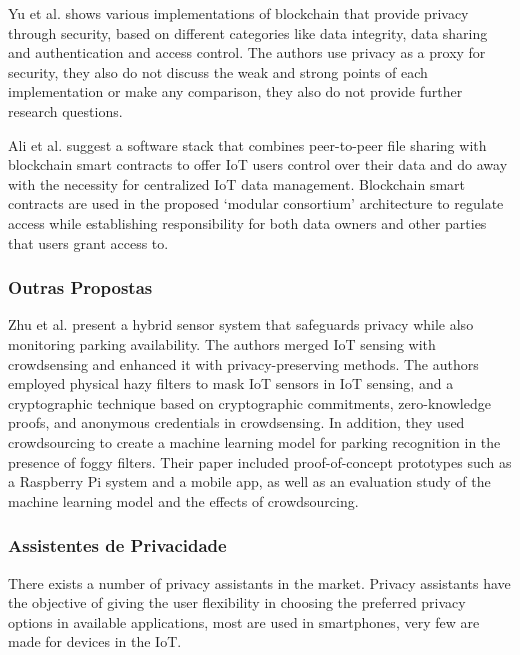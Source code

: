 \documentclass[conference]{IEEEtran}
\begin{document}
Yu et al. \cite{yu2018blockchain} shows various implementations of blockchain
that provide privacy through security, based on different categories like
data integrity, data sharing and authentication and access control. The
authors use privacy as a proxy for security, they also do not discuss the
weak and strong points of each implementation or make any comparison, they
also do not provide further research questions.

Ali et al. \cite{AliIoT} suggest a software stack that combines peer-to-peer
file sharing with blockchain smart contracts to offer IoT users control
over their data and do away with the necessity for centralized IoT data
management. Blockchain smart contracts are used in the proposed `modular
consortium' architecture to regulate access while establishing responsibility
for both data owners and other parties that users grant access to.

\subsubsection{Outras Propostas}

Zhu et al. \cite{ZhuIntegrating} present a hybrid sensor system that safeguards
privacy while also monitoring parking availability. The authors merged IoT
sensing with crowdsensing and enhanced it with privacy-preserving methods.
The authors employed physical hazy filters to mask IoT sensors in IoT sensing,
and a cryptographic technique based on cryptographic commitments, zero-knowledge
proofs, and anonymous credentials in crowdsensing. In addition, they used
crowdsourcing to create a machine learning model for parking recognition
in the presence of foggy filters. Their paper included proof-of-concept
prototypes such as a Raspberry Pi system and a mobile app, as well as an
evaluation study of the machine learning model and the effects of crowdsourcing.

\subsubsection{Assistentes de Privacidade}

There exists a number of privacy assistants in the market. Privacy assistants
have the objective of giving the user flexibility in choosing the preferred
privacy options in available applications, most are used in smartphones,
very few are made for devices in the IoT.
\end{document}
